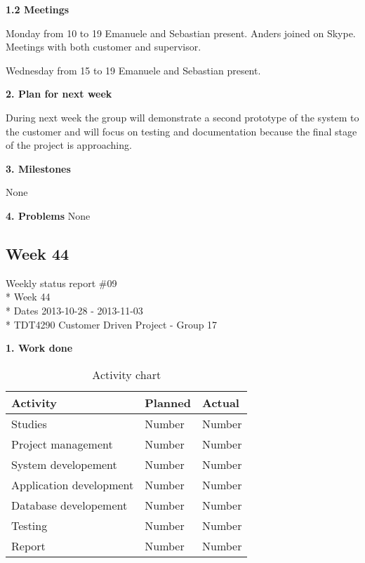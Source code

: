\textbf{1.2 Meetings}

Monday from 10 to 19
Emanuele and Sebastian present. Anders joined on Skype.
Meetings with both customer and supervisor.

Wednesday from 15 to 19
Emanuele and Sebastian present.

\textbf{2. Plan for next week}

During next week the group will demonstrate a second prototype of the system to the customer and will focus on testing and documentation because the final stage of the project is approaching.

\textbf{3. Milestones}

None

\textbf{4. Problems}
None

\newpage
\subsection{Week 44}

\begin{center}
Weekly status report \#09\\*
Week 44 \\*
Dates 2013-10-28 - 2013-11-03 \\*
TDT4290 Customer Driven Project - Group 17
\end{center}

\textbf{1. Work done}

\begin{table}[H]
\begin{center}
\begin{tabular}{ l | l | l }
  \hline
  Activity & Planned & Actual \\
  \hline\noalign{\smallskip}\noalign{\smallskip}\hline
  Studies & Number & Number \\
  Project management & Number & Number \\
  System developement & Number & Number \\
  Application development & Number & Number \\
  Database developement & Number & Number \\
  Testing & Number & Number \\
  Report & Number & Number \\
  \hline
\end{tabular}
\end{center}
\caption{Activity chart}
\label{table:activityChartStatusReport}
\end{table}

